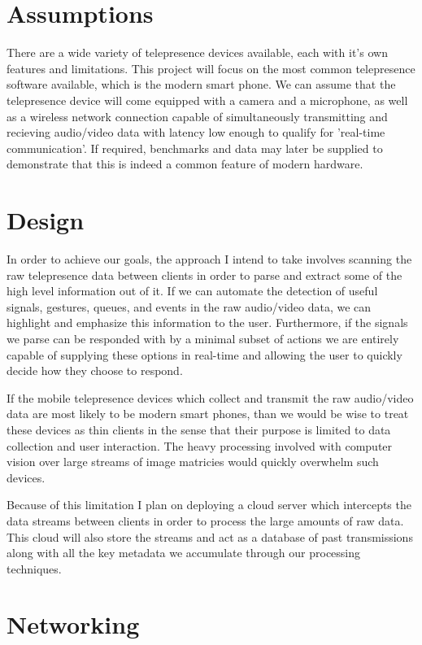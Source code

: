 \documentclass[a4paper,12pt]{report}
\begin{document}
\section{Assumptions}

There are a wide variety of telepresence devices available, each with it's own features and limitations. This project will focus on the most common telepresence software available, which is the modern smart phone. We can assume that the telepresence device will come equipped with a camera and a microphone, as well as a wireless network connection capable of simultaneously transmitting and recieving audio/video data with latency low enough to qualify for 'real-time communication'. If required, benchmarks and data may later be supplied to demonstrate that this is indeed a common feature of modern hardware.

\section{Design}

In order to achieve our goals, the approach I intend to take involves scanning the raw telepresence data between clients in order to parse and extract some of the high level information out of it. If we can automate the detection of useful signals, gestures, queues, and events in the raw audio/video data, we can highlight and emphasize this information to the user. Furthermore, if the signals we parse can be responded with by a minimal subset of actions we are entirely capable of supplying these options in real-time and allowing the user to quickly decide how they choose to respond.
 
If the mobile telepresence devices which collect and transmit the raw audio/video data are most likely to be modern smart phones, than we would be wise to treat these devices as thin clients in the sense that their purpose is limited to data collection and user interaction. The heavy processing involved with computer vision over large streams of image matricies would quickly overwhelm such devices.

Because of this limitation I plan on deploying a cloud server which intercepts the data streams between clients in order to process the large amounts of raw data. This cloud will also store the streams and act as a database of past transmissions along with all the key metadata we accumulate through our processing techniques.

\section{Networking}
\end{document}

